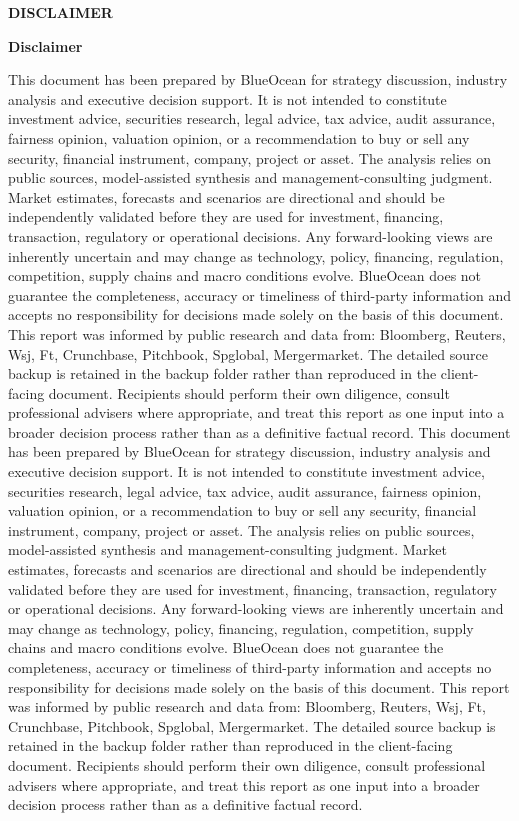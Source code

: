 \documentclass[10pt,a4paper]{article}
\begin{document}
\clearpage
{\textcolor{BOBlue}{\scriptsize\bfseries DISCLAIMER}}\par\vspace{3pt}
{\Large\sffamily\bfseries\color{BONavy} Disclaimer}\par\vspace{4pt}
\vspace{2pt}{\color{BOBright}\rule{\linewidth}{1pt}}\vspace{5pt}
{\footnotesize\color{BOMuted} This document has been prepared by BlueOcean for strategy discussion, industry analysis and executive decision support. It is not intended to constitute investment advice, securities research, legal advice, tax advice, audit assurance, fairness opinion, valuation opinion, or a recommendation to buy or sell any security, financial instrument, company, project or asset. The analysis relies on public sources, model-assisted synthesis and management-consulting judgment. Market estimates, forecasts and scenarios are directional and should be independently validated before they are used for investment, financing, transaction, regulatory or operational decisions. Any forward-looking views are inherently uncertain and may change as technology, policy, financing, regulation, competition, supply chains and macro conditions evolve. BlueOcean does not guarantee the completeness, accuracy or timeliness of third-party information and accepts no responsibility for decisions made solely on the basis of this document. This report was informed by public research and data from: Bloomberg, Reuters, Wsj, Ft, Crunchbase, Pitchbook, Spglobal, Mergermarket. The detailed source backup is retained in the backup folder rather than reproduced in the client-facing document. Recipients should perform their own diligence, consult professional advisers where appropriate, and treat this report as one input into a broader decision process rather than as a definitive factual record. This document has been prepared by BlueOcean for strategy discussion, industry analysis and executive decision support. It is not intended to constitute investment advice, securities research, legal advice, tax advice, audit assurance, fairness opinion, valuation opinion, or a recommendation to buy or sell any security, financial instrument, company, project or asset. The analysis relies on public sources, model-assisted synthesis and management-consulting judgment. Market estimates, forecasts and scenarios are directional and should be independently validated before they are used for investment, financing, transaction, regulatory or operational decisions. Any forward-looking views are inherently uncertain and may change as technology, policy, financing, regulation, competition, supply chains and macro conditions evolve. BlueOcean does not guarantee the completeness, accuracy or timeliness of third-party information and accepts no responsibility for decisions made solely on the basis of this document. This report was informed by public research and data from: Bloomberg, Reuters, Wsj, Ft, Crunchbase, Pitchbook, Spglobal, Mergermarket. The detailed source backup is retained in the backup folder rather than reproduced in the client-facing document. Recipients should perform their own diligence, consult professional advisers where appropriate, and treat this report as one input into a broader decision process rather than as a definitive factual record.}
\end{document}
